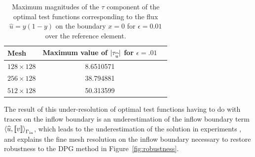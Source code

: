 \begin{table}
  \label{table:magnitudes}
  \begin{center}
  \begin{tabular}{|| l || c || r   }
    \hline
    Mesh & Maximum value of $| \tau_{\uh} |$ for $\epsilon=.01$ \\ \hline
    $128\times 128$ & 8.6510571  \\ \hline
    $256\times 128$ & 38.794881  \\ \hline
    $512\times 128$ & 50.313599  \\
    \hline
  \end{tabular}
\end{center}
\caption{Maximum magnitudes of the $\tau$ component of the optimal test functions corresponding to the flux $\widehat{u}=y(1-y)$ on the boundary $x = 0$ for $\epsilon = 0.01$ over the reference element.  }
\end{table}

The result of this under-resolution of optimal test functions having to do with traces on the inflow boundary is an underestimation of the inflow boundary term $\LRa{\uh,\jump{v}}_{\Gamma_{\rm in}}$, which leads to the underestimation of the solution in experiments \cite{shishkinDPG}, and explains the fine mesh resolution on the inflow boundary necessary to restore robustness to the DPG method in Figure~\ref{fig:robustness}.  

